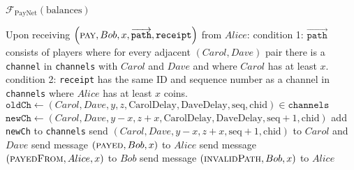 \begin{functionality}{$\mathcal{F}_{\mathrm{PayNet}}
\left(\mathrm{balances}\right)$}
\begin{algorithmic}[1]
    \State Upon receiving $\left(\textsc{pay}, Bob, x,
    \overrightarrow{\mathtt{path}}, \mathtt{receipt}\right)$ from $Alice$:
    \Indent
      \State condition 1: $\overrightarrow{\mathtt{path}}$ consists of players
      where for every adjacent $\left(Carol, Dave\right)$ pair there is a
      \texttt{channel} in \texttt{channels} with $Carol$ and $Dave$ and where
      $Carol$ has at least $x$.
      \State condition 2: \texttt{receipt} has the same ID and sequence number
      as a channel in \texttt{channels} where $Alice$ has at least $x$ coins.
          \State $\mathtt{oldCh} \gets \left(Carol, Dave, y, z,
          \mathrm{CarolDelay}, \mathrm{DaveDelay}, \mathrm{seq},
          \mathrm{chid}\right) \in \mathtt{channels}$
          \State $\mathtt{newCh} \gets \left(Carol, Dave, y - x, z + x,
          \mathrm{CarolDelay}, \mathrm{DaveDelay}, \mathrm{seq} + 1,
          \mathrm{chid}\right)$
          \State add \texttt{newCh} to \texttt{channels}
          \State send $\left(Carol, Dave, y - x, z + x, \mathrm{seq} + 1,
          \mathrm{chid}\right)$ to $Carol$ and $Dave$ 
        \EndFor
        \State send message $\left(\textsc{payed}, Bob, x\right)$ to $Alice$
        \State send message $\left(\textsc{payedFrom}, Alice, x\right)$ to $Bob$
      \Else {}
        \State send message $\left(\textsc{invalidPath}, Bob, x\right)$ to
        $Alice$
      \EndIf
    \EndIndent
    \State


\end{algorithmic}
\end{functionality}
